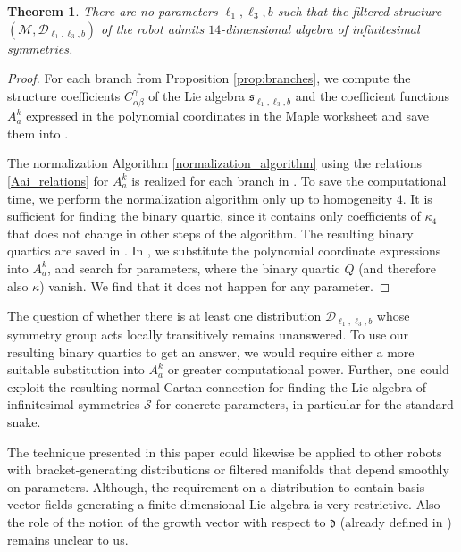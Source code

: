 \documentclass{amsart}
\theoremstyle{plain}
\newtheorem{theorem}{Theorem}
\theoremstyle{definition}
\theoremstyle{remark}
\newcommand{\mc}[1]{\mathcal{#1}}
\newcommand{\mfk}[1]{\mathfrak{#1}}
\begin{document}
\begin{theorem} \label{thm:results}
    There are no parameters $\ell_1, \ell_3, b$ such that the filtered structure $(\mc{M}, \mc{D}_{\ell_1, \ell_3, b})$ of the robot admits $14$-dimensional algebra of infinitesimal symmetries.
\end{theorem}
\begin{proof}
    For each branch from Proposition \ref{prop:branches}, we compute the structure coefficients $C_{\alpha \beta}^\gamma$ of the Lie algebra $\mfk{s}_{\ell_1, \ell_3, b}$ and the coefficient functions $A_a^k$ expressed in the polynomial coordinates in the Maple worksheet \cite[\texttt{vectorfields.mw}]{attached_files} and save them into \cite[\texttt{branches.m}]{attached_files}.
    
    The normalization Algorithm \ref{normalization_algorithm} using the relations \eqref{Aai_relations} for $A_a^k$ is realized for each branch in \cite[\texttt{normalization.mw}]{attached_files}. To save the computational time, we perform the normalization algorithm only up to homogeneity $4$. It is sufficient for finding the binary quartic, since it contains only coefficients of $\kappa_4$ that does not change in other steps of the algorithm. The resulting binary quartics are saved in \cite[\texttt{biquartics.m}]{attached_files}. In \cite[flatcase.mw]{attached_files}, we substitute the polynomial coordinate expressions into $A_a^k$, and search for parameters, where the binary quartic $Q$ (and therefore also $\kappa$) vanish. We find that it does not happen for any parameter.
\end{proof}

The question of whether there is at least one distribution $\mc{D}_{\ell_1, \ell_3, b}$ whose symmetry group acts locally transitively remains unanswered. To use our resulting binary quartics to get an answer, we would require either a more suitable substitution into $A_a^k$ or greater computational power. Further, one could exploit the resulting normal Cartan connection for finding the Lie algebra of infinitesimal symmetries $\mc{S}$ for concrete parameters, in particular for the standard snake.

The technique presented in this paper could likewise be applied to other robots with bracket-generating distributions or filtered manifolds that depend smoothly on parameters. Although, the requirement on a distribution to contain basis vector fields generating a finite dimensional Lie algebra is very restrictive. Also the role of the notion of the growth vector with respect to $\mathfrak{d}$ (already defined in \cite{md2024}) remains unclear to us.
\end{document}
